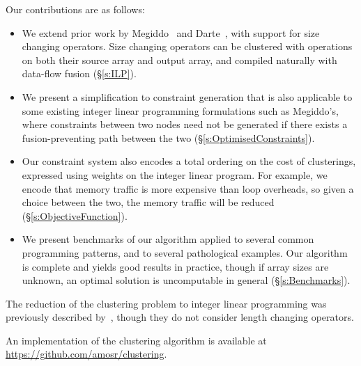 
Our contributions are as follows:
\begin{itemize}
\item   
We extend prior work by Megiddo~\cite{megiddo1998optimal} and Darte~\cite{darte2002contraction}, with support for size changing operators.
Size changing operators can be clustered with operations on both their source array and output array, and compiled naturally with data-flow fusion (\S\ref{s:ILP}).

\item
We present a simplification to constraint generation that is also applicable to some existing integer linear programming formulations such as Megiddo's,
where constraints between two nodes need not be generated if there exists a fusion-preventing path between the two (\S\ref{s:OptimisedConstraints}).

\item
Our constraint system also encodes a total ordering on the cost of clusterings, expressed using weights on the integer linear program. For example, we encode that memory traffic is more expensive than loop overheads, so given a choice between the two, the memory traffic will be reduced (\S\ref{s:ObjectiveFunction}).

\item
We present benchmarks of our algorithm applied to several common programming patterns, and to several pathological examples.
Our algorithm is complete and yields good results in practice, though if array sizes are unknown, an optimal solution is uncomputable in general (\S\ref{s:Benchmarks}).
\end{itemize}

The reduction of the clustering problem to integer linear programming was previously described by~\cite{megiddo1998optimal}, though they do not consider length changing operators.

An implementation of the clustering algorithm is available at \url{https://github.com/amosr/clustering}.




